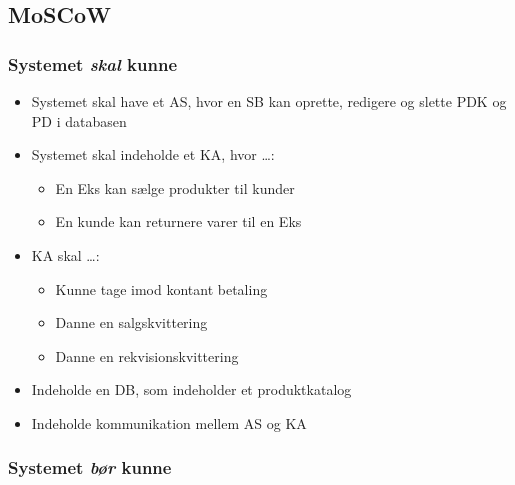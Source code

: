 \subsection{MoSCoW}

\subsubsection*{Systemet \textit{skal} kunne}

\begin{itemize}

\item Systemet skal have et \gls{AS}, hvor en \gls{SB} kan oprette, redigere og slette \gls{PDK} og \gls{PD} i databasen
\item Systemet skal indeholde et \gls{KA}, hvor …:
\begin{itemize}
\item En \gls{Eks} kan sælge produkter til kunder
\item En kunde kan returnere varer til en \gls{Eks}
\end{itemize}
\item \gls{KA} skal …:
\begin{itemize}
\item Kunne tage imod kontant betaling
\item Danne en salgskvittering
\item Danne en rekvisionskvittering
\end{itemize}
\item Indeholde en \gls{DB}, som indeholder et produktkatalog
\item Indeholde kommunikation mellem \gls{AS} og \gls{KA}

\end{itemize}


\subsubsection*{Systemet \textit{bør} kunne}


